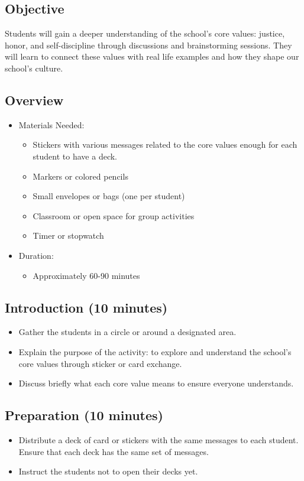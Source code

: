 \documentclass[11pt]{article}
\begin{document}
\subsection{Objective}
\label{sec:orge6cac1e}
Students will gain a deeper understanding of the school's core values: justice, honor,
and self-discipline through discussions and brainstorming sessions. They will learn to
connect these values with real life examples and how they shape our school's culture.

\subsection{Overview}
\label{sec:org68a86e6}
\begin{itemize}
\item Materials Needed:
\begin{itemize}
\item Stickers with various messages related to the core values enough for each
student to have a deck.
\item Markers or colored pencils
\item Small envelopes or bags (one per student)
\item Classroom or open space for group activities
\item Timer or stopwatch
\end{itemize}
\item Duration:
\begin{itemize}
\item Approximately 60-90 minutes
\end{itemize}
\end{itemize}

\subsection{Introduction (10 minutes)}
\label{sec:org956fea7}
\begin{itemize}
\item Gather the students in a circle or around a designated area.
\item Explain the purpose of the activity: to explore and understand the school's core
values through sticker or card exchange.
\item Discuss briefly what each core value means to ensure everyone understands.
\end{itemize}

\subsection{Preparation (10 minutes)}
\label{sec:orgc61b707}
\begin{itemize}
\item Distribute a deck of card or stickers with the same messages to each student.
Ensure that each deck has the same set of messages.
\item Instruct the students not to open their decks yet.
\end{itemize}
\end{document}
